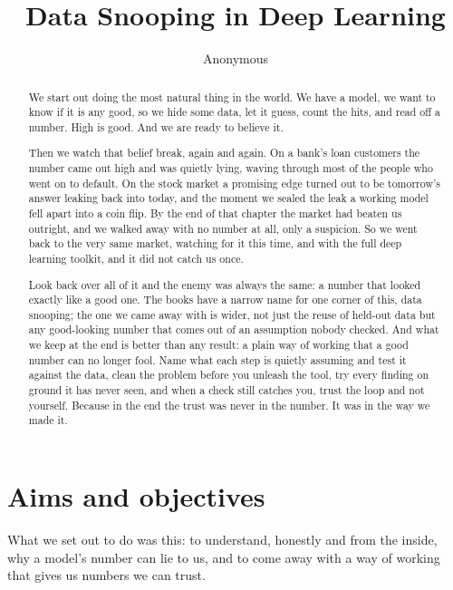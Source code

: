 \documentclass[11pt]{article} %
\title{Data Snooping in Deep Learning}
\author{Anonymous}
\begin{document}
\maketitle

\declaration

\begin{abstract}
We start out doing the most natural thing in the world. We have a model, we want to know if it is any good, so we hide some data, let it guess, count the hits, and read off a number. High is good. And we are ready to believe it.

Then we watch that belief break, again and again. On a bank's loan customers the number came out high and was quietly lying, waving through most of the people who went on to default. On the stock market a promising edge turned out to be tomorrow's answer leaking back into today, and the moment we sealed the leak a working model fell apart into a coin flip. By the end of that chapter the market had beaten us outright, and we walked away with no number at all, only a suspicion. So we went back to the very same market, watching for it this time, and with the full deep learning toolkit, and it did not catch us once.

Look back over all of it and the enemy was always the same: a number that looked exactly like a good one. The books have a narrow name for one corner of this, data snooping; the one we came away with is wider, not just the reuse of held-out data but any good-looking number that comes out of an assumption nobody checked. And what we keep at the end is better than any result: a plain way of working that a good number can no longer fool. Name what each step is quietly assuming and test it against the data, clean the problem before you unleash the tool, try every finding on ground it has never seen, and when a check still catches you, trust the loop and not yourself. Because in the end the trust was never in the number. It was in the way we made it.
\end{abstract}



\section*{Aims and objectives}


What we set out to do was this: to understand, honestly and from the inside, why a model's number can lie to us, and to come away with a way of working that gives us numbers we can trust.
\end{document}
